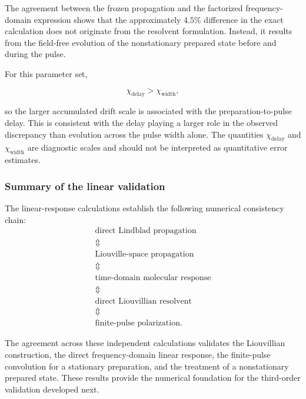 \documentclass[11pt]{article}
\begin{document}
The agreement between the frozen propagation and the factorized
frequency-domain expression shows that the approximately $4.5\%$
difference in the exact calculation does not originate from the
resolvent formulation.  Instead, it results from the field-free
evolution of the nonstationary prepared state before and during the
pulse.

For this parameter set,

\begin{equation}
\chi_{\mathrm{delay}}
>
\chi_{\mathrm{width}},
\end{equation}

so the larger accumulated drift scale is associated with the
preparation-to-pulse delay. This is consistent with the delay playing
a larger role in the observed discrepancy than evolution across the
pulse width alone. The quantities $\chi_{\mathrm{delay}}$ and
$\chi_{\mathrm{width}}$ are diagnostic scales and should not be
interpreted as quantitative error estimates.


\subsubsection{Summary of the linear validation}

The linear-response calculations establish the following numerical
consistency chain:
%
\begin{equation}
\boxed{
\begin{gathered}
\text{direct Lindblad propagation}
\\
\Updownarrow
\\
\text{Liouville-space propagation}
\\
\Updownarrow
\\
\text{time-domain molecular response}
\\
\Updownarrow
\\
\text{direct Liouvillian resolvent}
\\
\Updownarrow
\\
\text{finite-pulse polarization}.
\end{gathered}
}
\end{equation}

The agreement across these independent calculations validates the
Liouvillian construction, the direct frequency-domain linear response,
the finite-pulse convolution for a stationary preparation, and the
treatment of a nonstationary prepared state.  These results provide the
numerical foundation for the third-order validation developed next.
\end{document}
